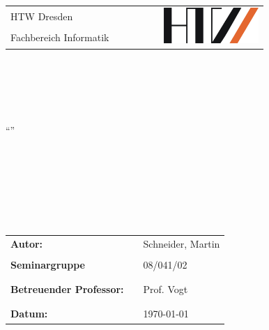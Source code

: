 \thispagestyle{empty}
\begin{center}
\begin{tabular}{lcr}
 \Large{HTW Dresden} & \verb|       |& \multirow{3}{*}{\includegraphics[height=1.353cm]{material/htwlogo.jpg}} \\
 \Large{Fachbereich Informatik} &  & \\
\end{tabular}\end{center}
\begin{center}


\end{center}
\begin{verbatim}





\end{verbatim}
\begin{center}
\textbf{\LARGE{\ownTitle}}

"`\ownTitleZ"'

\end{center}
\begin{verbatim}



\end{verbatim}
\begin{center}
\end{center}
\begin{verbatim}




\end{verbatim}
\begin{flushleft}
\begin{tabular}{lll}
\textbf{Autor:} & & Schneider, Martin\\
& & \\
\textbf{Seminargruppe} & & 08/041/02\\
& & \\
& & \\
\textbf{Betreuender Professor:} & & Prof. Vogt\\
& & \\
& & \\
\textbf{Datum:} & & \today\\

\end{tabular}

\end{flushleft}